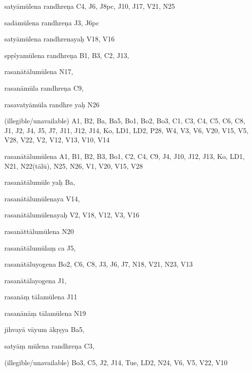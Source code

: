 \begin{ekdosis}
\begin{marma}[hp01_055]
\begin{marma}[hp02_009]
\begin{marma}[hp02_011]
      \begin{marma}[hp02_56*1]
      \item[satyāmūlena randhreṇa] C4, J6, J8pc, J10, J17, V21, N25
      \item[sadāmūlena randhreṇa] J3, J6pc
      \item[satyāmūlena randhrenayaḥ] V18, V16
      \item[spṛśyamūlena randhreṇa] B1, B3, C2, J13,  
      \item[rasanātālumūlena] N17, 
      \item[rasanāmūla randhreṇa] C9, 
      \item[rasavatyāmūla randhre yaḥ] N26
      \item[]
      \item[]
      \item[(illegible/unavailable)] A1, B2, Ba, Ba5, Bo1, Bo2, Bo3, C1, C3, C4, C5, C6, C8, J1, J2, J4, J5, J7, J11, J12, J14, Ko, LD1, LD2, P28, W4, V3, V6, V20, V15, V5, V28, V22, V2, V12, V13, V10, V14
        \begin{description}

        \end{description}
      \end{marma}


      \begin{marma}[hp02_57a]
      \item[rasanātālumūlena] A1, B1, B2, B3, Bo1, C2, C4, C9, J4, J10, J12, J13, Ko, LD1, N21, N22(tālū), N25, N26, V1, V20, V15, V28
      \item[rasanātālumūle yaḥ] Ba,
      \item[rasanātālumūlenaya] V14,
      \item[rasanātālumūlenayaḥ] V2, V18, V12, V3, V16
      \item[rasanāttālumūlena] N20
      \item[rasanātālumūlaṃ ca] J5, 
      \item[rasanātāluyogena] Bo2, C6, C8, J3, J6, J7, N18, V21, N23, V13
      \item[rasanātālayogena] J1,
      \item[rasanāṃ tālamūlena] J11
      \item[rasanānāṃ tālamūlena] N19
      \item[jihvayā vāyum ākṛṣya] Ba5,
      \item[satyāṃ mūlena randhreṇa] C3,
      \item[]
      \item[(illegible/unavailable)] Bo3, C5, J2, J14, Tue, LD2, N24, V6, V5, V22, V10
        \begin{description}


\end{description}
\end{marma}
\end{marma}
\end{marma}
\end{marma}
\end{ekdosis}
